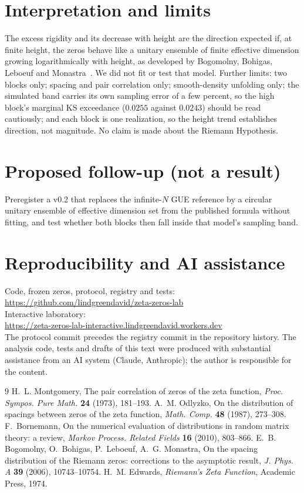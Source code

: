 \documentclass[11pt]{article}
\begin{document}
\section{Interpretation and limits}
The excess rigidity and its decrease with height are the direction expected if, at finite height, the zeros behave
like a unitary ensemble of finite effective dimension growing logarithmically with height, as developed by
Bogomolny, Bohigas, Leboeuf and Monastra~\cite{bogomolny2006}. We did not fit or test that model. Further limits:
two blocks only; spacing and pair correlation only; smooth-density unfolding only; the simulated band carries its own
sampling error of a few percent, so the high block's marginal KS exceedance ($0.0255$ against $0.0243$) should
be read cautiously; and each block is one realization, so the height trend establishes direction, not magnitude.
No claim is made about the Riemann Hypothesis.

\section{Proposed follow-up (not a result)}
Preregister a v0.2 that replaces the infinite-$N$ GUE reference by a circular unitary ensemble of effective dimension
set from the published formula without fitting, and test whether both blocks then fall inside that model's sampling
band.

\section*{Reproducibility and AI assistance}
Code, frozen zeros, protocol, registry and tests:\\
\url{https://github.com/lindgreendavid/zeta-zeros-lab}\\
Interactive laboratory:\\
\url{https://zeta-zeros-lab-interactive.lindgreendavid.workers.dev}\\
The protocol commit precedes the
registry commit in the repository history. The analysis code, tests and drafts of this text were produced with
substantial assistance from an AI system (Claude, Anthropic); the author is responsible for the content.

\begin{thebibliography}{9}
 H.~L. Montgomery, The pair correlation of zeros of the zeta function,
\emph{Proc. Sympos. Pure Math.} \textbf{24} (1973), 181--193.
 A.~M. Odlyzko, On the distribution of spacings between zeros of the zeta function,
\emph{Math. Comp.} \textbf{48} (1987), 273--308.
 F.~Bornemann, On the numerical evaluation of distributions in random matrix theory: a review,
\emph{Markov Process. Related Fields} \textbf{16} (2010), 803--866.
 E.~B. Bogomolny, O.~Bohigas, P.~Leboeuf, A.~G. Monastra, On the spacing distribution of the
Riemann zeros: corrections to the asymptotic result, \emph{J. Phys. A} \textbf{39} (2006), 10743--10754.
 H.~M. Edwards, \emph{Riemann's Zeta Function}, Academic Press, 1974.
\end{thebibliography}
\end{document}

